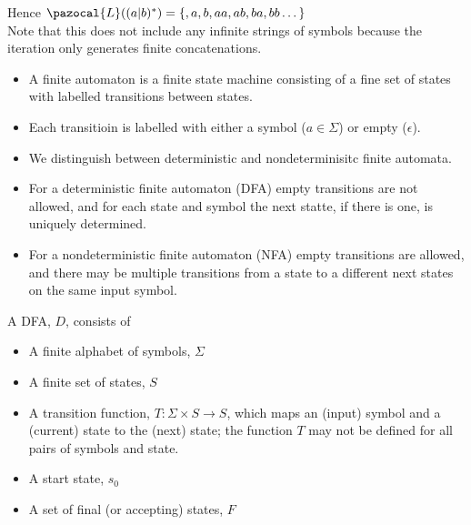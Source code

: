 Hence $\pazocal{L}((a|b)^*) = \{, a, b, aa, ab, ba, bb \dots \}$ \\
Note that this does not include any infinite strings of symbols because the iteration only generates finite concatenations.
\begin{itemize}
    \item A finite automaton is a finite state machine consisting of a fine set of states with labelled transitions between states. 
    \item Each transitioin is labelled with either a symbol ($a \in \Sigma$) or empty ($\epsilon$).
    \item We distinguish between deterministic and nondeterminisitc finite automata.
    \item For a deterministic finite automaton (DFA) empty transitions are not allowed, and for each state and symbol the next statte, if there is one, is uniquely determined. 
    \item For a nondeterministic finite automaton (NFA) empty transitions are allowed, and there may be multiple transitions from a state to a different next states on the same input symbol.
\end{itemize}

A DFA, $D$, consists of
\begin{itemize}
    \item A finite alphabet of symbols, $\Sigma$
    \item A finite set of states, $S$
    \item A transition function, $T : \Sigma \times S \rightarrow S$, which maps an (input) symbol and a (current) state to the (next) state; the function $T$ may not be defined for all pairs of symbols and state. 
    \item A start state, $s_0$ 
    \item A set of final (or accepting) states, $F$
\end{itemize}


